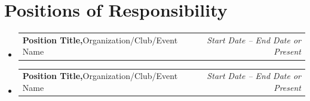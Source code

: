 \documentclass[a4paper,11pt]{article}
\makeatletter
\newcommand{\resumePOR}[3]{
\vspace{0.5mm}\item
    \begin{tabular*}{0.97\textwidth}[t]{l@{\extracolsep{\fill}}r}
        \textbf{#1}\hspace{0.3mm}#2 & \textit{\small{#3}} 
    \end{tabular*}
    \vspace{-2mm}
}
\newcommand{\resumeSubHeadingListStart}{\begin{itemize}[leftmargin=*,labelsep=0mm]}
\newcommand{\resumeSubHeadingListEnd}{\end{itemize}\vspace{2mm}}
\makeatother
\begin{document}

\section{Positions of Responsibility}
\vspace{0pt}
\resumeSubHeadingListStart

\resumePOR{Position Title,} 
    {Organization/Club/Event Name} 
    {Start Date – End Date or Present}

\resumePOR{Position Title,} 
    {Organization/Club/Event Name} 
    {Start Date – End Date or Present}

\resumeSubHeadingListEnd
\vspace{-4mm}



\end{document}

